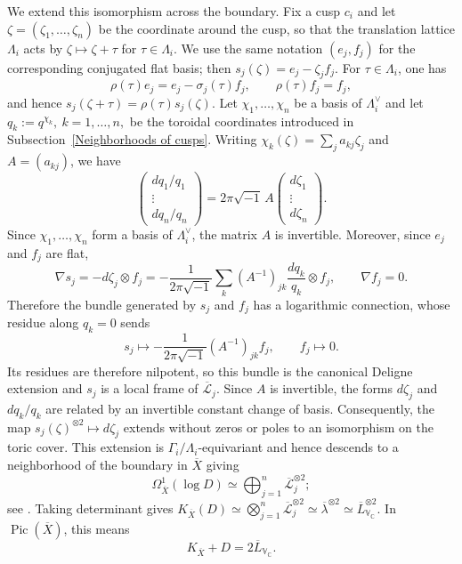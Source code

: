 \documentclass[12 pt]{amsart}
\theoremstyle{definition}
\begin{document}
We extend this isomorphism across the boundary. Fix a cusp $c_i$ and let $\zeta=(\zeta_1,\ldots,\zeta_n)$ be the coordinate around the cusp, so that the translation lattice $\Lambda_i$ acts by $\zeta\mapsto\zeta+\tau$ for $\tau\in\Lambda_i$. We use the same notation $(e_j,f_j)$ for the corresponding conjugated flat basis; then \(s_j(\zeta)=e_j-\zeta_jf_j.
\)
For $\tau\in\Lambda_i$, one has
\[\rho(\tau)e_j=e_j-\sigma_j(\tau)f_j,\qquad \rho(\tau)f_j=f_j,
\]
and hence
\(s_j(\zeta+\tau)=\rho(\tau)s_j(\zeta).\) Let $\chi_1,\ldots,\chi_n$ be a basis of $\Lambda_i^\vee$ and let
\(
q_k:=q^{\chi_k},\ k=1,\ldots,n,
\)
be the toroidal coordinates introduced in Subsection~\ref{Neighborhoods of cusps}.
Writing
\(\chi_k(\zeta)=\sum_ja_{kj}\zeta_j\)
and $A=(a_{kj})$, we have
\[
\begin{pmatrix}
dq_1/q_1\\
\vdots\\
dq_n/q_n
\end{pmatrix}
=
2\pi\sqrt{-1}\,A
\begin{pmatrix}
d\zeta_1\\
\vdots\\
d\zeta_n
\end{pmatrix}.
\]
Since $\chi_1,\ldots,\chi_n$ form a basis of $\Lambda_i^\vee$, the matrix $A$ is invertible. Moreover, since $e_j$ and $f_j$ are flat,
\[\nabla s_j=-d\zeta_j\otimes f_j
=-\frac{1}{2\pi\sqrt{-1}}\sum_k(A^{-1})_{jk}\frac{dq_k}{q_k}\otimes f_j,
\qquad
\nabla f_j=0.
\]
Therefore the bundle generated by $s_j$ and $f_j$ has a logarithmic connection, whose residue along $q_k=0$ sends
\[s_j\longmapsto-\frac{1}{2\pi\sqrt{-1}}(A^{-1})_{jk}f_j,
\qquad
f_j\longmapsto0.
\]
Its residues are therefore nilpotent, so this bundle is the canonical Deligne extension and $s_j$ is a local frame of $\overline{\mathcal L}_j$. Since $A$ is invertible, the forms $d\zeta_j$ and $dq_k/q_k$ are related by an invertible constant change of basis. Consequently, the map $s_j(\zeta)^{\otimes2}\mapsto d\zeta_j$ extends without zeros or poles to an isomorphism  on the toric cover. This extension is $\Gamma_i/\Lambda_i$-equivariant and hence descends to a neighborhood of the boundary in $\overline X$ giving
\[
\Omega_{\overline X}^1(\log D)
\simeq\bigoplus_{j=1}^n\overline{\mathcal L}_j^{\otimes2};
\]
see \cite[Theorem~5.2(iii)]{DimitrovTilouine2004}. Taking determinant gives
\(
K_{\overline X}(D)
\simeq\bigotimes_{j=1}^n\overline{\mathcal L}_j^{\otimes2}
\simeq\overline\lambda^{\otimes2}
\simeq\overline L_{\mathbb V_{\mathbb C}}^{\otimes2}.
\)
In $\operatorname{Pic}(\overline X)$, this means
\begin{equation}\label{log-Griffiths}
K_{\overline X}+D
=2\overline L_{\mathbb V_{\mathbb C}}.
\end{equation}
\end{document}
